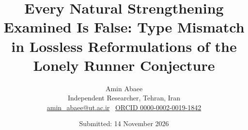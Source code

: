 \documentclass[11pt,a4paper]{article}
\numberwithin{equation}{section}
\theoremstyle{plain}
\theoremstyle{definition}
\theoremstyle{remark}
\newcommand{\papertitle}{Every Natural Strengthening Examined Is False: Type Mismatch in Lossless Reformulations of the Lonely Runner Conjecture}
\begin{document}
\title{\papertitle}
\author{Amin Abaee\\[2pt] {\small Independent Researcher, Tehran, Iran}\\[1pt] {\small \href{mailto:amin_abaee@ut.ac.ir}{amin\_abaee@ut.ac.ir} \textbullet\ \href{https://orcid.org/0000-0002-0019-1842}{ORCID 0000-0002-0019-1842}}}
\date{Submitted: 14 November 2026}
\maketitle

\tableofcontents
\clearpage

\end{document}
